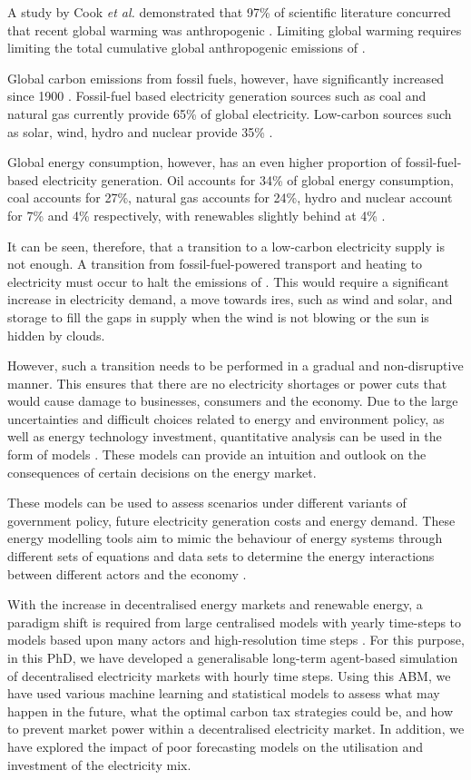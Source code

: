 A study by Cook \textit{et al.} demonstrated that 97\% of scientific literature concurred that recent global warming was anthropogenic \cite{Cook2013}. Limiting global warming requires limiting the total cumulative global anthropogenic emissions of  \cite{Masson-Delmotte2018}. 

Global carbon emissions from fossil fuels, however, have significantly increased since 1900 \cite{boden2017global}.    Fossil-fuel based electricity generation sources such as coal and natural gas currently provide 65\% of global electricity. Low-carbon sources such as solar, wind, hydro and nuclear provide 35\% \cite{BP2018}. 

Global energy consumption, however, has an even higher proportion of fossil-fuel-based electricity generation. Oil accounts for 34\% of global energy consumption, coal accounts for 27\%, natural gas accounts for 24\%, hydro and nuclear account for 7\% and 4\% respectively, with renewables slightly behind at 4\% \cite{BP2018}. 

It can be seen, therefore, that a transition to a low-carbon electricity supply is not enough. A transition from fossil-fuel-powered transport and heating to electricity must occur to halt the emissions of . This would require a significant increase in electricity demand, a move towards \gls{ires}, such as wind and solar, and storage to fill the gaps in supply when the wind is not blowing or the sun is hidden by clouds. 

However, such a transition needs to be performed in a gradual and non-disruptive manner. This ensures that there are no electricity shortages or power cuts that would cause damage to businesses, consumers and the economy. Due to the large uncertainties and difficult choices related to energy and environment policy, as well as energy technology investment, quantitative analysis can be used in the form of models \cite{DeCarolis2012}. These models can provide an intuition and outlook on the consequences of certain decisions on the energy market.

These models can be used to assess scenarios under different variants of government policy, future electricity generation costs and energy demand. These energy modelling tools aim to mimic the behaviour of energy systems through different sets of equations and data sets to determine the energy interactions between different actors and the economy \cite{Machado2019}.

With the increase in decentralised energy markets and renewable energy, a paradigm shift is required from large centralised models with yearly time-steps to models based upon many actors and high-resolution time steps \cite{Ringkjob2018, Pfenninger2014b}. For this purpose, in this PhD, we have developed a generalisable long-term agent-based simulation of decentralised electricity markets with hourly time steps. Using this \gls{ABM}, we have used various machine learning and statistical models to assess what may happen in the future, what the optimal carbon tax strategies could be, and how to prevent market power within a decentralised electricity market. In addition, we have explored the impact of poor forecasting models on the utilisation and investment of the electricity mix. 

